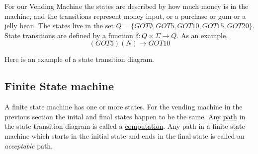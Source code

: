 \documentclass{scrartcl}
\begin{document}
\begin{minipage}{0.45\linewidth}
For our Vending Machine the states are described by how much money is in the machine, and the transitions represent money input, or a purchase or gum or a jelly bean. The states live in the set $Q=\{GOT\emptyset,GOT5,GOT10,GOT15,GOT20\}$.\\ State transitions are defined by a function $\delta: Q\times\Sigma\rightarrow Q$. As an example, 
\begin{displaymath}
(GOT5)(N) \rightarrow GOT10 
\end{displaymath}

Here is an example of a state transition diagram.
\end{minipage}
\begin{minipage}{0.45\linewidth}\centering
{}
\end{minipage}
\subsection{Finite State machine}
A finite state machine has one or more states. For the vending machine in the previous section the inital and final states happen to be the same. Any \underline{path} in the state transition diagram is called a \underline{computation}. Any path in a finite state machine which starts in the initial state and ends in the final state is called an \emph{acceptable} path.\\
\end{document}
